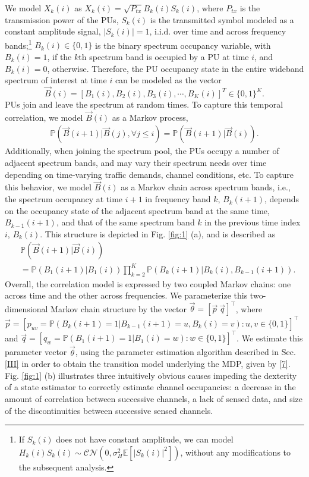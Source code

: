 \documentclass[10pt,twocolumn]{IEEEtran}
\begin{document}
We model $X_k(i)$ as $X_k(i){=}\sqrt{P_{tx}}B_k(i)S_k(i)$, where $P_{tx}$ is the transmission power of the PUs, $S_k(i)$ is the transmitted symbol modeled as a constant amplitude signal, $|S_k(i)|{=}1$, i.i.d. over time and across frequency bands;\footnote{If $S_k(i)$ does not have constant amplitude, we can model $H_{k}(i)S_{k}(i){\sim}\mathcal{CN}(0,\sigma_H^2\mathbb{E}[|S_{k}(i)|^2])$, without any modifications to the subsequent analysis.} $B_k(i){\in}\{0,1\}$ is the binary spectrum occupancy variable, with $B_k(i){=}1$, if the $k$th spectrum band is occupied by a PU at time $i$, and $B_k(i){=}0$, otherwise. Therefore, the PU occupancy state in the entire wideband spectrum of interest at time $i$ can be modeled as the vector 
\begin{equation}\label{5}
    \vec{B}(i) = [B_1(i), B_2(i), B_3(i), \cdots, B_K(i)]^T {\in} \{0, 1\}^K.
\end{equation}
PUs join and leave the spectrum at random times. To capture this temporal correlation, we model $\vec{B}(i)$ as a Markov process,
\begin{equation}\label{6}
    \begin{aligned}
        \mathbb{P}(\vec{B}(i+1)|\vec{B}(j), \forall j \leq i) = \mathbb{P}(\vec{B}(i+1)|\vec{B}(i)).
    \end{aligned}
\end{equation}
Additionally, when joining the spectrum pool, the PUs occupy a number of adjacent spectrum bands, and may vary their spectrum needs over time depending on time-varying traffic demands, channel conditions, etc. To capture this behavior, we model $\vec{B}(i)$ as a Markov chain across spectrum bands, i.e., the spectrum occupancy at time $i{+}1$ in frequency band $k$, $B_{k}(i{+}1)$, depends on the occupancy state of the adjacent spectrum band at the same time, $B_{k{-}1}(i{+}1)$, and that of the same spectrum band $k$ in the previous time index $i$, $B_{k}(i)$. This structure is depicted in Fig. \ref{fig:1} (a), and is described as
\begin{align}\label{7}
&         \mathbb{P}(\vec{B}(i+1)|\vec{B}(i))\\&=
\nonumber
         \mathbb{P}(B_{1}(i+1)|B_{1}(i))
         \prod_{k=2}^{K} \mathbb{P}(B_{k}(i+1)|B_{k}(i), B_{k-1}(i+1)).
\end{align}
Overall, the correlation model is expressed by two coupled Markov chains: one across time and the other across frequencies. We parameterize this two-dimensional Markov chain structure by the vector $\vec{\theta}{=}[\vec{p}\ \vec{q}]^\intercal$, where $\vec{p}{=}[p_{uv}{=}\mathbb{P}(B_{k}(i{+}1){=}1|B_{k{-}1}(i{+}1){=}u,B_{k}(i){=}v){:} u,v{\in}\{0,1\}]^{\intercal}$ and $\vec{q}=[q_{w}=\mathbb{P}(B_{1}(i+1)=1|B_{1}(i)=w):w \in \{0,1\}]^\intercal$. We estimate this parameter vector $\vec{\theta}$, using the parameter estimation algorithm described in Sec. \ref{III} in order to obtain the transition model underlying the MDP, given by \eqref{7}. Fig. \ref{fig:1} (b) illustrates three intuitively obvious causes impeding the dexterity of a state estimator to correctly estimate channel occupancies: a decrease in the amount of correlation between successive channels, a lack of sensed data, and size of the discontinuities between successive sensed channels.
\end{document}
